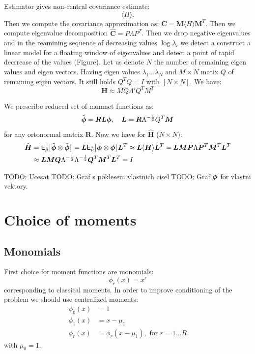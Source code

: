 \documentclass{article}
\def\tn#1{\boldsymbol{#1}}
\def \E{{\mathsf E}}
\def\todo#1{{\color{red}TODO: #1}}
\def\avg#1{\langle#1\rangle}
\begin{document}
Estimator gives non-central covariance estimate:
\[
 \avg{H}. 
\]
Then we compute the covariance approximation as: $\hat{\tn C} = \tn M \avg{H} \tn M^T$.
Then we compute eigenvalue decomposition $\hat{\tn C}= P \Lambda P^T$. 
Then we drop negative eigenvalues and in the reamining sequence
of decreasing values $\log \lambda_i$ we detect a construct a linear model for a floating window of eigenvalues and detect a point of rapid decrrease of the values (Figure). Let us denote $N$ the number of remaining eigen values and eigen vectors. Having eigen values $\lambda_1 \dots \lambda_N$ and $M\times N$ matix $Q$ of remaining eigen vectors. It still holds $Q^T Q = I$ with $[N\times N]$. 
We have:
\[
   \tn H \approx M Q\Lambda' Q^TM^T
\]

We prescribe reduced set of momnet functions as:
\[
   \tilde\vphi = \tn R \tn L \vphi, \quad \tn L =  \tn R \Lambda^{-\frac12} Q^T \tn M
\]
for any ortonormal matrix $\tn R$. 
Now we have for $\hat{\tn H}$ ($N\times N$):
\begin{align*}
  \hat{\tn H} &= \E_{\estrho}\big[ \tilde\vphi \otimes \tilde\vphi\big] 
              = \tn L \E_{\estrho} \big[\vphi \otimes \vphi \big] \tn L^T 
              \approx \tn L \avg{\tn H} \tn L^T = \tn L \tn M \tn P \Lambda \tn P^T \tn M^T \tn L^T \\
              &\approx \tn L \tn M \tn Q \Lambda^{-\frac12} \Lambda^{-\frac12} \tn Q^T \tn M^T \tn L^T  = I 
\end{align*}


\todo{Ucesat}
\todo{Graf s poklesem vlastnich cisel}
\todo{Graf $\mathbf{\boldsymbol{\phi}}$ for vlastni vektory.}



\section{Choice of moments}
\subsection{Monomials}
First choice for moment functions are monomials:
\[
    \phi_r(x) = x^r
\]
corresponding to classical moments.
In order to improve conditioning of the problem we should use centralized moments:
\begin{align}
    \phi_0(x) &= 1\\
    \phi_1(x) &= x - \mu_1\\
    \phi_r(x) &= \phi_r(x - \mu_1), \text{ for }r=1\dots R
\end{align}
with $\mu_0 = 1$.
\end{document}
